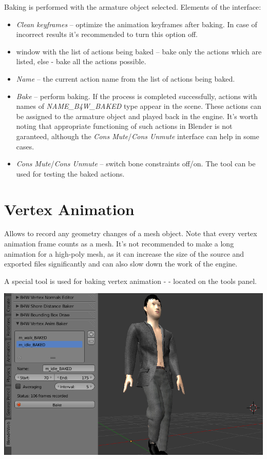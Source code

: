\documentclass[a4paper,12pt,oneside]{sphinxmanual}
\begin{document}
Baking is performed with the armature object selected. Elements of the  interface:
\begin{itemize}
\item {} 
\emph{Clean keyframes} -- optimize the animation keyframes after baking. In case of incorrect results it's recommended to turn this option off.

\item {} 
window with the list of actions being baked -- bake only the actions which are listed, else - bake all the actions possible.

\item {} 
\emph{Name} -- the current action name from the list of actions being baked.

\item {} 
\emph{Bake} -- perform baking. If the process is completed successfully, actions with names of \emph{NAME\_B4W\_BAKED} type appear in the scene. These actions can be assigned to the armature object and played back in the engine. It's worth noting that appropriate functioning of such actions in Blender is not garanteed, although the \emph{Cons Mute}/\emph{Cons Unmute} interface can help in some cases.

\item {} 
\emph{Cons Mute}/\emph{Cons Unmute} -- switch bone constraints off/on. The tool can be used for testing the baked actions.

\end{itemize}


\section{Vertex Animation}
\label{animation:id5}
Allows to record any geometry changes of a mesh object. Note that every vertex animation frame counts as a mesh. It's not recommended to make a long animation for a high-poly mesh, as it can increase the size of the source and exported files significantly and can also slow down the work of the engine.

A special tool is used for baking vertex animation -  - located on the  tools panel.

{\hfill\includegraphics[width=1.000\linewidth]{vertex_anim_baker.jpg}\hfill}
\end{document}

